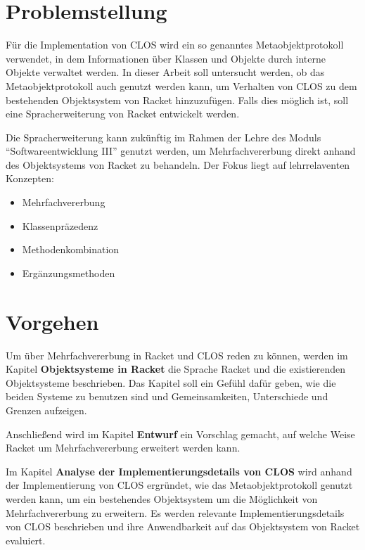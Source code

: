 \section{Problemstellung} 
Für die Implementation von CLOS wird ein so genanntes Metaobjektprotokoll verwendet, in dem Informationen über Klassen und Objekte durch interne Objekte verwaltet werden. In dieser Arbeit soll untersucht werden, ob das Metaobjektprotokoll auch genutzt werden kann, um Verhalten von CLOS zu dem bestehenden Objektsystem von Racket hinzuzufügen. Falls dies möglich ist, soll eine Spracherweiterung von Racket entwickelt werden. 

Die Spracherweiterung kann zukünftig im Rahmen der Lehre des Moduls ``Softwareentwicklung III'' genutzt werden, um Mehrfachvererbung direkt anhand des Objektsystems von Racket zu behandeln. Der Fokus liegt auf lehrrelaventen Konzepten: 
\begin{itemize}
 \item Mehrfachvererbung
 \item Klassenpräzedenz
 \item Methodenkombination
 \item Ergänzungsmethoden
\end{itemize}

% 


\section{Vorgehen}
Um über Mehrfachvererbung in Racket und CLOS reden zu können, werden im Kapitel \textbf{Objektsysteme in Racket} die Sprache Racket und die existierenden Objektsysteme beschrieben. Das Kapitel soll ein Gefühl dafür geben, wie die beiden Systeme zu benutzen sind und Gemeinsamkeiten, Unterschiede und Grenzen aufzeigen.

Anschließend wird im Kapitel \textbf{Entwurf} ein Vorschlag gemacht, auf welche Weise Racket um Mehrfachvererbung erweitert werden kann. 

Im Kapitel \textbf{Analyse der Implementierungsdetails von CLOS} wird anhand der Implementierung von CLOS ergründet, wie das Metaobjektprotokoll genutzt werden kann, um ein bestehendes Objektsystem um die Möglichkeit von Mehrfachvererbung zu erweitern. Es werden relevante Implementierungsdetails von CLOS beschrieben und ihre Anwendbarkeit auf das Objektsystem von Racket evaluiert.


